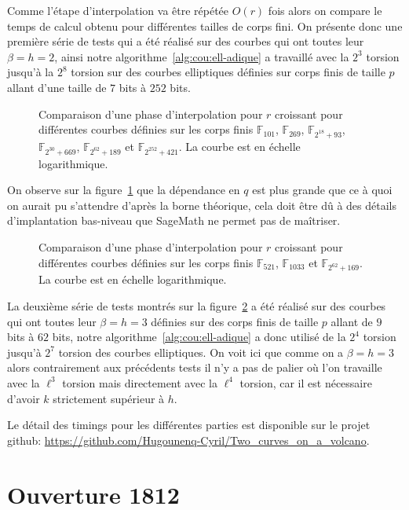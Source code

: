\documentclass[10pt,a4paper]{book}
\theoremstyle{plain}
\theoremstyle{definition}
\theoremstyle{definition}
\theoremstyle{definition}
\theoremstyle{definition}
\theoremstyle{remark}
\theoremstyle{remark}
\theoremstyle{definition}
\begin{document}
Comme l'étape d'interpolation va être répétée $O(r)$ fois alors on compare le 
temps de calcul obtenu pour différentes tailles de corps fini.
On présente donc une première série de tests qui a été réalisé sur des 
courbes qui ont toutes leur $\beta=h=2$, ainsi notre 
algorithme~\ref{alg:cou:ell-adique} a travaillé avec la $2^3$ torsion jusqu'à la 
$2^8$ torsion sur des courbes elliptiques définies sur corps finis de taille 
$p$ allant d'une taille de $7$ bits à $252$ bits.



\begin{figure}
\label{fig:exp:dif}
%
\caption{Comparaison d'une phase d'interpolation pour $r$ croissant pour différentes courbes définies sur les corps finis $\mathbb{F}_{101}$, $\mathbb{F}_{269}$, $\mathbb{F}_{2^{18}+93 }$, $\mathbb{F}_{2^{30}+669}$, $\mathbb{F}_{2^{62}+189}$ et $\mathbb{F}_{2^{252}+421}$. La courbe est en échelle logarithmique.}
\end{figure}

On observe sur la figure~\ref{fig:exp:dif} que la dépendance en $q$ est plus 
grande que ce à quoi on aurait pu s'attendre d'après la borne théorique, cela 
doit être dû à des détails d'implantation bas-niveau que SageMath ne permet pas
de maîtriser.

\begin{figure}
\label{fig:exp:niv}
%
\caption{Comparaison d'une phase d'interpolation pour $r$ croissant pour différentes courbes définies sur les corps finis $\mathbb{F}_{521}$, $\mathbb{F}_{1033}$ et $\mathbb{F}_{2^{62}+169 }$. La courbe est en échelle logarithmique.}
\end{figure}

La deuxième série de tests montrés sur la figure~\ref{fig:exp:niv} a été réalisé
sur des courbes qui ont toutes leur $\beta=h=3$ définies sur des corps finis de
taille $p$ allant de $9$ bits à $62$ bits, notre algorithme~\ref{alg:cou:ell-adique} a donc utilisé de la 
$2^4$ torsion jusqu'à $2^7$ torsion des courbes elliptiques. On voit ici que comme on a 
$\beta=h=3$ alors contrairement aux précédents tests il n'y a pas de palier où l'on travaille avec la 
$\ell^{3}$ torsion mais directement avec la $\ell^4$ torsion, car il est 
nécessaire d'avoir $k$ strictement supérieur à $h$.

Le détail des timings pour les 
différentes parties est disponible sur le projet github: 
\url{https://github.com/Hugounenq-Cyril/Two_curves_on_a_volcano}. 
\chapter{Ouverture 1812}
\end{document}
